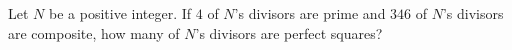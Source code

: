 Let $N$ be a positive integer. If $4$ of $N$'s divisors are prime and $346$ of $N$'s divisors are composite, how many of $N$'s divisors are perfect squares?
